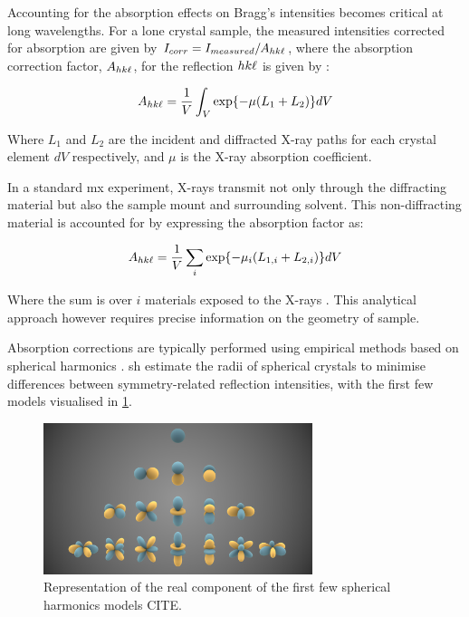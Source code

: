
Accounting for the absorption effects on Bragg’s intensities becomes critical at long wavelengths. For a lone crystal sample, the measured intensities corrected for absorption are given by $I_{corr} = I_{measured}/A_{hk\ell}$, where the absorption correction factor, $A_{hk\ell}$, for the reflection $hk\ell$ is given by \cite{Albrecht1939}: %

\begin{equation}
    A_{hk\ell} = \frac{1}{V} \int_V \exp{-\mu(L_1+L_2)} dV
    \label{AbsFactor}
\end{equation}

Where $L_1$ and $L_2$ are the incident and diffracted X-ray paths for each crystal element $dV$ respectively, and $\mu$ is the X-ray absorption coefficient. \cite{Busing1957}

In a standard \ac{mx} experiment, X-rays transmit not only through the diffracting material but also the sample mount and surrounding solvent. This non-diffracting material is accounted for by expressing the absorption factor as:

\begin{equation}
    A_{hk\ell} = \frac{1}{V} \sum_i \exp{-\mu_i (L_{1,i}+L_{2,i})} dV
    \label{AbsFactor_allmaterials}
\end{equation}

Where the sum is over $i$ materials exposed to the X-rays \cite{Santoro1968}. This analytical approach however requires precise information on the geometry of sample.

Absorption corrections are typically performed using empirical methods based on spherical harmonics \cite{Blessing1995}. \ac{sh} estimate the radii of spherical crystals to minimise differences between symmetry-related reflection intensities, with the first few models visualised in \cref{fig:SH}. %


\begin{figure}
    \centering
    \includegraphics[width = 0.7\textwidth]{images/Spherical_Harmonics.png}
    \caption{Representation of the real component of the first few spherical harmonics models CITE.}
    \label{fig:SH}
\end{figure}

